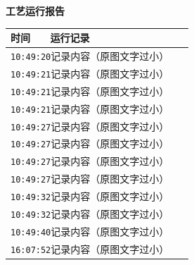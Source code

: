 \documentclass[UTF8,10pt,a4paper,fontset=fandol]{ctexart}
\newcommand{\fieldvalue}[1]{#1}
\begin{document}
\begin{minipage}[t]{0.48\linewidth}
\centering
\textbf{工艺运行报告}

\small
\begin{tabular}{|p{0.20\linewidth}|p{0.72\linewidth}|}
\hline
时间 & 运行记录\\ \hline
\multicolumn{2}{|l|}{
\fieldvalue{\texttt{10:49:20}\quad 记录内容（原图文字过小）}} \\ \hline
\multicolumn{2}{|l|}{
\fieldvalue{\texttt{10:49:21}\quad 记录内容（原图文字过小）}} \\ \hline
\multicolumn{2}{|l|}{
\fieldvalue{\texttt{10:49:21}\quad 记录内容（原图文字过小）}} \\ \hline
\multicolumn{2}{|l|}{
\fieldvalue{\texttt{10:49:21}\quad 记录内容（原图文字过小）}} \\ \hline
\multicolumn{2}{|l|}{
\fieldvalue{\texttt{10:49:27}\quad 记录内容（原图文字过小）}} \\ \hline
\multicolumn{2}{|l|}{
\fieldvalue{\texttt{10:49:27}\quad 记录内容（原图文字过小）}} \\ \hline
\multicolumn{2}{|l|}{
\fieldvalue{\texttt{10:49:27}\quad 记录内容（原图文字过小）}} \\ \hline
\multicolumn{2}{|l|}{
\fieldvalue{\texttt{10:49:27}\quad 记录内容（原图文字过小）}} \\ \hline
\multicolumn{2}{|l|}{
\fieldvalue{\texttt{10:49:32}\quad 记录内容（原图文字过小）}} \\ \hline
\multicolumn{2}{|l|}{
\fieldvalue{\texttt{10:49:32}\quad 记录内容（原图文字过小）}} \\ \hline
\multicolumn{2}{|l|}{
\fieldvalue{\texttt{10:49:40}\quad 记录内容（原图文字过小）}} \\ \hline
\multicolumn{2}{|l|}{
\fieldvalue{\texttt{16:07:52}\quad 记录内容（原图文字过小）}} \\ \hline

\end{tabular}
\end{minipage}
\end{document}
